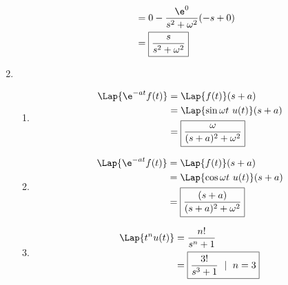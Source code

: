 \documentclass[main.tex]{subfiles}
\begin{document}
\begin{enumerate}
\begin{enumerate}
\begin{align*}
					\\&= 0 - \frac{\e^0}{s^2+\omega^2}(-s + 0)
					\\&= \boxed{\frac{s}{s^2+\omega^2}}
				\end{align*}
		\end{enumerate}
	\item
		\begin{enumerate}
				\item 
					\begin{align*}
						\Lap{\e^{-at}f(t)} 
						  &= \Lap{f(t)}(s+a)
						\\&= \Lap{\sin{\omega t}\ u(t)}(s+a)
						\\&= \boxed{\frac{\omega}{(s+a)^2+\omega^2}}
					\end{align*}
				\item
					\begin{align*}
						\Lap{\e^{-at}f(t)}
						  &= \Lap{f(t)}(s+a)
						\\&= \Lap{\cos{\omega t}\ u(t)}(s+a)
						\\&= \boxed{\frac{(s+a)}{(s+a)^2+\omega^2}}
					\end{align*}
				\item
					\begin{align*}
						\Lap{t^n u(t)} 
						  &= \frac{n!}{s^n+1}
						\\&= \boxed{\frac{3!}{s^3+1}\ \mid\ n = 3}
					\end{align*}
		\end{enumerate}


\end{enumerate}
\end{document}
